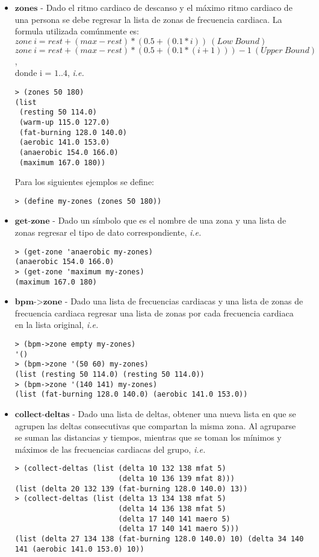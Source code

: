 \documentclass{article}
\begin{document}
\begin{itemize}
\item $\textbf{zones}$ - Dado el ritmo cardiaco de descanso y el máximo ritmo cardiaco de una persona se debe regresar la lista de zonas de frecuencia cardiaca. La formula utilizada comúnmente es:\\
  $zone\ i = rest + (max - rest) * (0.5 + (0.1*i))\ (Low\ Bound)$\\
  $zone\ i = rest + (max - rest) * (0.5 + (0.1*(i+1))) - 1\ (Upper\ Bound)$,\\
  donde i = $1..4$, \textit{i.e.}

\begin{verbatim}
> (zones 50 180)
(list
 (resting 50 114.0)
 (warm-up 115.0 127.0)
 (fat-burning 128.0 140.0)
 (aerobic 141.0 153.0)
 (anaerobic 154.0 166.0)
 (maximum 167.0 180))
\end{verbatim}

Para los siguientes ejemplos se define:
\begin{verbatim}
> (define my-zones (zones 50 180))
\end{verbatim}

\item $\textbf{get-zone}$ - Dado un símbolo que es el nombre de una zona y una lista de zonas regresar el tipo de dato correspondiente, \textit{i.e.}
\begin{verbatim}
> (get-zone 'anaerobic my-zones)
(anaerobic 154.0 166.0)
> (get-zone 'maximum my-zones)
(maximum 167.0 180)
\end{verbatim}

\item $\textbf{bpm->zone}$ - Dado una lista de frecuencias cardiacas y una lista de zonas de frecuencia cardiaca regresar una lista de zonas por cada frecuencia cardiaca en la lista original, \textit{i.e.}
\begin{verbatim}
> (bpm->zone empty my-zones)
'()
> (bpm->zone '(50 60) my-zones) 
(list (resting 50 114.0) (resting 50 114.0))
> (bpm->zone '(140 141) my-zones) 
(list (fat-burning 128.0 140.0) (aerobic 141.0 153.0))
\end{verbatim}

\item $\textbf{collect-deltas}$ - Dado una lista de deltas, obtener una nueva lista en que se agrupen las deltas consecutivas que compartan la misma zona. Al agruparse se suman las distancias y tiempos, mientras que se toman los mínimos y máximos de las frecuencias cardiacas del grupo, \textit{i.e.}
\begin{verbatim}
> (collect-deltas (list (delta 10 132 138 mfat 5) 
                        (delta 10 136 139 mfat 8)))
(list (delta 20 132 139 (fat-burning 128.0 140.0) 13))
> (collect-deltas (list (delta 13 134 138 mfat 5) 
                        (delta 14 136 138 mfat 5)
                        (delta 17 140 141 maero 5)
                        (delta 17 140 141 maero 5)))
(list (delta 27 134 138 (fat-burning 128.0 140.0) 10) (delta 34 140 141 (aerobic 141.0 153.0) 10))
\end{verbatim}
\end{itemize}
\end{document}
